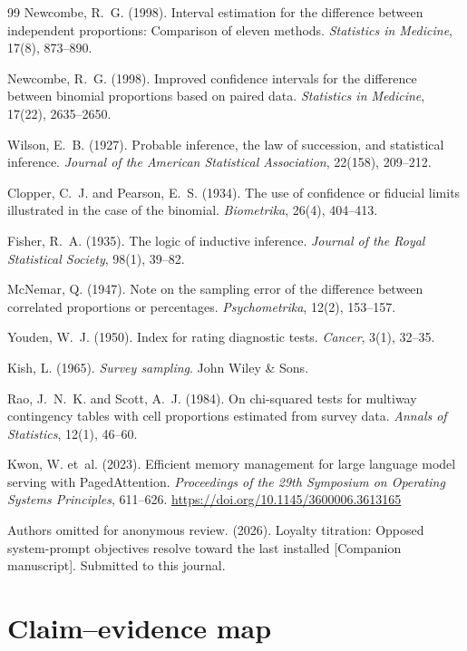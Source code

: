 \documentclass{article}
\begin{document}
\begin{thebibliography}{99}
Newcombe, R.~G. (1998). Interval estimation for the difference between
independent proportions: Comparison of eleven methods. \emph{Statistics in
Medicine}, 17(8), 873--890.

Newcombe, R.~G. (1998). Improved confidence intervals for the difference
between binomial proportions based on paired data. \emph{Statistics in
Medicine}, 17(22), 2635--2650.

Wilson, E.~B. (1927). Probable inference, the law of succession, and
statistical inference. \emph{Journal of the American Statistical Association},
22(158), 209--212.

Clopper, C.~J. and Pearson, E.~S. (1934). The use of confidence or fiducial
limits illustrated in the case of the binomial. \emph{Biometrika}, 26(4),
404--413.

Fisher, R.~A. (1935). The logic of inductive inference. \emph{Journal of the
Royal Statistical Society}, 98(1), 39--82.

McNemar, Q. (1947). Note on the sampling error of the difference between
correlated proportions or percentages. \emph{Psychometrika}, 12(2), 153--157.

Youden, W.~J. (1950). Index for rating diagnostic tests. \emph{Cancer}, 3(1),
32--35.

Kish, L. (1965). \emph{Survey sampling}. John Wiley \& Sons.

Rao, J.~N.~K. and Scott, A.~J. (1984). On chi-squared tests for multiway
contingency tables with cell proportions estimated from survey data.
\emph{Annals of Statistics}, 12(1), 46--60.

Kwon, W. et~al. (2023). Efficient memory management for large language model
serving with PagedAttention. \emph{Proceedings of the 29th Symposium on
Operating Systems Principles}, 611--626.
\url{https://doi.org/10.1145/3600006.3613165}

Authors omitted for anonymous review. (2026). Loyalty titration: Opposed
system-prompt objectives resolve toward the last installed [Companion
manuscript]. Submitted to this journal.

\end{thebibliography}

\appendix

\section{Claim--evidence map}
\label{app:claims}
\end{document}
